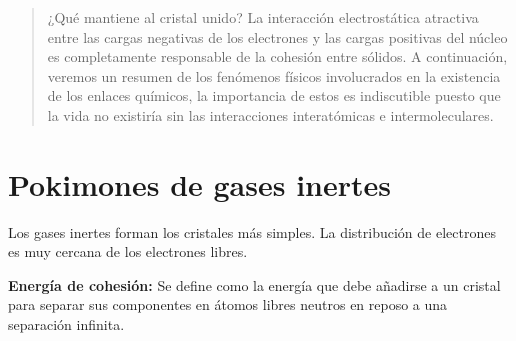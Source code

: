 \documentclass{article}
\begin{document}
\begin{titlepage}

\vfill
{}
\vfill
\hfill


\vfill





\hfill





\vfill
\vfill



\end{titlepage}

\newpage


\begin{abstract}
    ¿Qué mantiene al cristal unido? La interacción electrostática atractiva entre las cargas negativas de los electrones y las cargas positivas del núcleo es completamente responsable de la cohesión entre sólidos. A continuación, veremos un resumen de los fenómenos físicos involucrados en la existencia de los enlaces químicos, la importancia de estos es indiscutible puesto que la vida no existiría sin las interacciones interatómicas e intermoleculares.
\end{abstract}{}



\section{Pokimones de gases inertes}
Los gases inertes forman los cristales más simples.  La distribución de electrones es muy cercana de los electrones libres.\cite{Kittel} 

\textbf{Energía de cohesión:} Se define como la energía que debe añadirse a un cristal para separar sus componentes en átomos libres neutros en reposo a una separación infinita.\\
\end{document}
